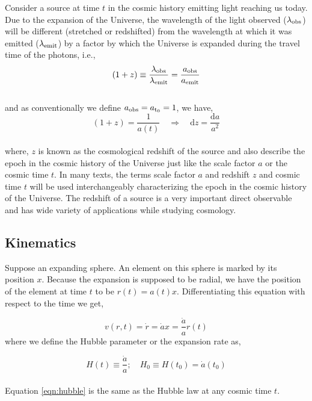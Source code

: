 Consider a source at time $t$ in the cosmic history emitting light reaching us today. 
Due to the expansion of the Universe, the wavelength of the light observed 
($\lambda_{\rm obs}$) will be different (stretched or redshifted) from the 
wavelength at which it was emitted ($\lambda_{\rm emit}$) by a factor by which
the Universe is expanded during the travel time of the photons, i.e.,
\begin{equation}
	(1+z) \equiv \dfrac{\lambda_{\rm obs}}{\lambda_{\rm emit}} = \dfrac{a_{\rm obs}}{a_{\rm emit}}
\end{equation}
\\
and as conventionally we define $a_{\rm obs} = a_{\rm t_0} = 1$, we have,
\begin{equation}
	(1+z) = \dfrac{1}{a(t)} \quad \Rightarrow \quad \mathrm{d}z = \dfrac{\mathrm{d}a}{a^2}
\end{equation}
\\
where, $z$ is known as the cosmological redshift of the source and also describe
the epoch in the cosmic history of the Universe just like the scale factor $a$ or 
the cosmic time $t$. In many texts, the terms scale factor 
$a$ and redshift $z$ and cosmic time $t$ will be used interchangeably 
characterizing the epoch in the cosmic history of the Universe. The redshift
of a source is a very important direct observable and has wide variety of 
applications while studying cosmology.



\subsection{Kinematics}


Suppose an expanding sphere. An element on this sphere is marked by
its position $x$. Because the expansion is supposed to be radial, we have the
position of the element at time $t$ to be $r(t) = a(t) x$. Differentiating 
this equation with respect to the time we get,

\begin{equation}
	v(r,t) = \dot{r} = \dot{a} x = \dfrac{\dot{a}}{a} r(t)
	\label{eqn:hubble}
\end{equation}
where we define the Hubble parameter or the expansion rate as,

\begin{equation}
	H(t) \equiv \dfrac{\dot{a}}{a};\quad H_0 \equiv H(t_0) = \dot{a}(t_0)
\end{equation}
\\
Equation \ref{eqn:hubble} is the same as the Hubble law at any cosmic time $t$. 




